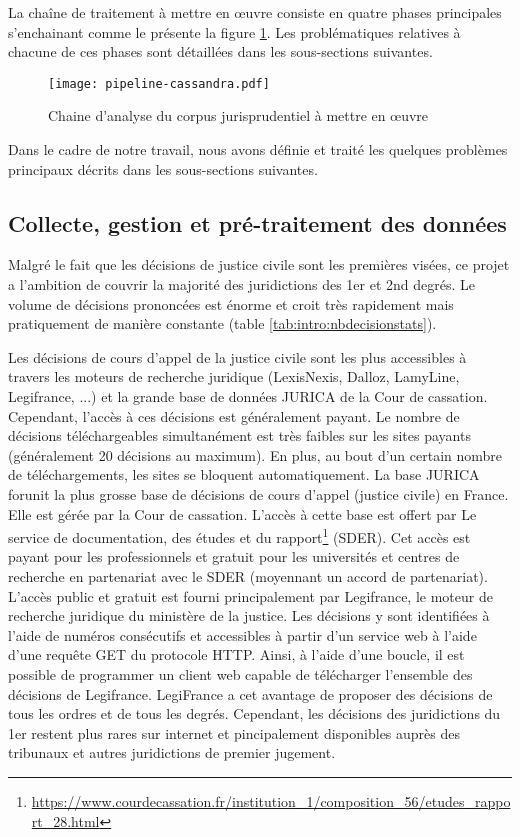 La chaîne de traitement à mettre en \oe uvre consiste en quatre phases principales s'enchainant comme le présente la figure \ref{fig:intro:pipeline-globale}. Les problématiques relatives à chacune de ces phases sont détaillées dans les sous-sections suivantes.
\begin{figure}[h]
\texttt{[image: pipeline-cassandra.pdf]}
\caption{Chaine d'analyse du corpus jurisprudentiel à mettre en \oe uvre} \label{fig:intro:pipeline-globale}
\end{figure} 

Dans le cadre de notre travail, nous avons définie et traité les quelques problèmes principaux décrits dans les sous-sections suivantes.

\subsection{Collecte, gestion et pré-traitement des données}

Malgré le fait que les décisions de justice civile sont les premières visées, ce projet a l'ambition de couvrir la majorité des juridictions des 1er et 2nd degrés. Le volume de décisions prononcées est énorme et croit très rapidement mais pratiquement de manière constante (table \ref{tab:intro:nbdecisionstats}).

Les décisions de cours d'appel de la justice civile sont les plus accessibles à travers les moteurs de recherche juridique (LexisNexis\textregistered, 
Dalloz\textregistered, LamyLine\textregistered, Legifrance\textregistered, ...) et la grande base de données JURICA de la Cour de cassation. Cependant, l'accès à ces décisions est généralement payant. Le nombre de décisions téléchargeables simultanément est très faibles sur les sites payants (généralement 20 décisions au maximum). En plus, au bout d'un certain nombre de téléchargements, les sites se bloquent automatiquement. La base JURICA forunit la plus grosse base de décisions de cours d'appel (justice civile) en France. Elle est gérée par la Cour de cassation. L'accès à cette base est offert par Le service de documentation, des études et du rapport\footnote{\url{https://www.courdecassation.fr/institution_1/composition_56/etudes_rapport_28.html}} (SDER). Cet accès est payant pour les professionnels et gratuit pour les universités et centres de recherche en partenariat avec le SDER (moyennant un accord de partenariat). L'accès public et gratuit est fourni principalement par Legifrance, le moteur de recherche juridique du ministère de la justice. Les décisions y sont identifiées à l'aide de numéros consécutifs et accessibles à partir d'un service web à l'aide d'une requête GET du protocole HTTP. Ainsi, à l'aide d'une boucle, il est possible de programmer un client web capable de télécharger l'ensemble des décisions de Legifrance. LegiFrance a cet avantage de proposer des décisions de tous les ordres et de tous les degrés. Cependant, les décisions des juridictions du 1er restent plus rares sur internet et pincipalement disponibles auprès des tribunaux et autres juridictions de premier jugement.


